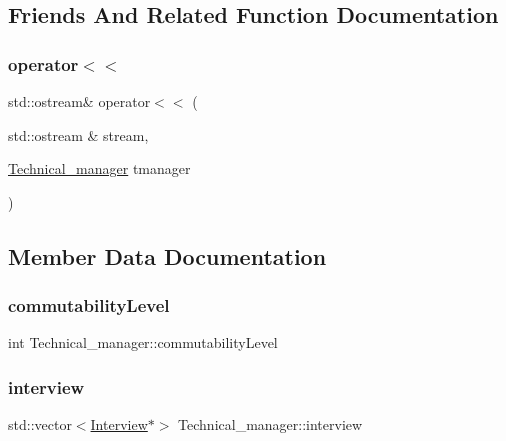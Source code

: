 \subsection{Friends And Related Function Documentation}
\hypertarget{class_technical__manager_a414b7f00e01c9ea9314ef822f5e6d34d}{}\label{class_technical__manager_a414b7f00e01c9ea9314ef822f5e6d34d} 
\subsubsection{\texorpdfstring{operator$<$$<$}{operator<<}}
{\footnotesize\ttfamily std\+::ostream\& operator$<$$<$ (\begin{DoxyParamCaption}\item[{std\+::ostream \&}]{stream,  }\item[{\hyperlink{class_technical__manager}{Technical\+\_\+manager}}]{tmanager }\end{DoxyParamCaption})\hspace{0.3cm}{\ttfamily [friend]}}



\subsection{Member Data Documentation}
\hypertarget{class_technical__manager_a42c180cd359d8c8c61d55aaeefeaf768}{}\label{class_technical__manager_a42c180cd359d8c8c61d55aaeefeaf768} 
\subsubsection{\texorpdfstring{commutability\+Level}{commutabilityLevel}}
{\footnotesize\ttfamily int Technical\+\_\+manager\+::commutability\+Level\hspace{0.3cm}{\ttfamily [private]}}

\hypertarget{class_technical__manager_af5aa30bc5574b94fd694d1927446b0ee}{}\label{class_technical__manager_af5aa30bc5574b94fd694d1927446b0ee} 
\subsubsection{\texorpdfstring{interview}{interview}}
{\footnotesize\ttfamily std\+::vector$<$\hyperlink{class_interview}{Interview}$\ast$$>$ Technical\+\_\+manager\+::interview}

